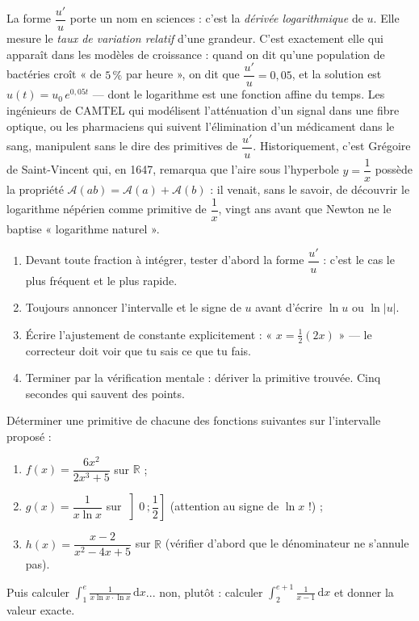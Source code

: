 \documentclass[11pt]{article}
\begin{document}
\begin{savaistu}
La forme $\dfrac{u'}{u}$ porte un nom en sciences : c'est la \emph{dérivée logarithmique} de $u$. Elle mesure le \emph{taux de variation relatif} d'une grandeur. C'est exactement elle qui apparaît dans les modèles de croissance : quand on dit qu'une population de bactéries croît « de $5\,\%$ par heure », on dit que $\dfrac{u'}{u} = 0{,}05$, et la solution est $u(t) = u_0\,e^{0{,}05t}$ — dont le logarithme est une fonction affine du temps. Les ingénieurs de CAMTEL qui modélisent l'atténuation d'un signal dans une fibre optique, ou les pharmaciens qui suivent l'élimination d'un médicament dans le sang, manipulent sans le dire des primitives de $\dfrac{u'}{u}$. Historiquement, c'est Grégoire de Saint-Vincent qui, en 1647, remarqua que l'aire sous l'hyperbole $y = \dfrac{1}{x}$ possède la propriété $\mathcal{A}(ab) = \mathcal{A}(a) + \mathcal{A}(b)$ : il venait, sans le savoir, de découvrir le logarithme népérien comme primitive de $\dfrac{1}{x}$, vingt ans avant que Newton ne le baptise « logarithme naturel ».
\end{savaistu}

\begin{methode}
\begin{enumerate}
\item Devant toute fraction à intégrer, tester d'abord la forme $\dfrac{u'}{u}$ : c'est le cas le plus fréquent et le plus rapide.
\item Toujours annoncer l'intervalle et le signe de $u$ avant d'écrire $\ln u$ ou $\ln|u|$.
\item Écrire l'ajustement de constante explicitement : « $x = \frac{1}{2}(2x)$ » — le correcteur doit voir que tu sais ce que tu fais.
\item Terminer par la vérification mentale : dériver la primitive trouvée. Cinq secondes qui sauvent des points.
\end{enumerate}
\end{methode}

\begin{exercice}
Déterminer une primitive de chacune des fonctions suivantes sur l'intervalle proposé :
\begin{enumerate}
\item $f(x) = \dfrac{6x^2}{2x^3 + 5}$ sur $\mathbb{R}$ ;
\item $g(x) = \dfrac{1}{x\ln x}$ sur $\left]0\,;\dfrac{1}{2}\right]$ (attention au signe de $\ln x$ !) ;
\item $h(x) = \dfrac{x - 2}{x^2 - 4x + 5}$ sur $\mathbb{R}$ (vérifier d'abord que le dénominateur ne s'annule pas).
\end{enumerate}
Puis calculer $\displaystyle\int_1^{e} \frac{1}{x\ln x \cdot \ln x}\,\mathrm{d}x$... non, plutôt : calculer $\displaystyle\int_2^{e+1} \frac{1}{x - 1}\,\mathrm{d}x$ et donner la valeur exacte.
\end{exercice}
\end{document}
